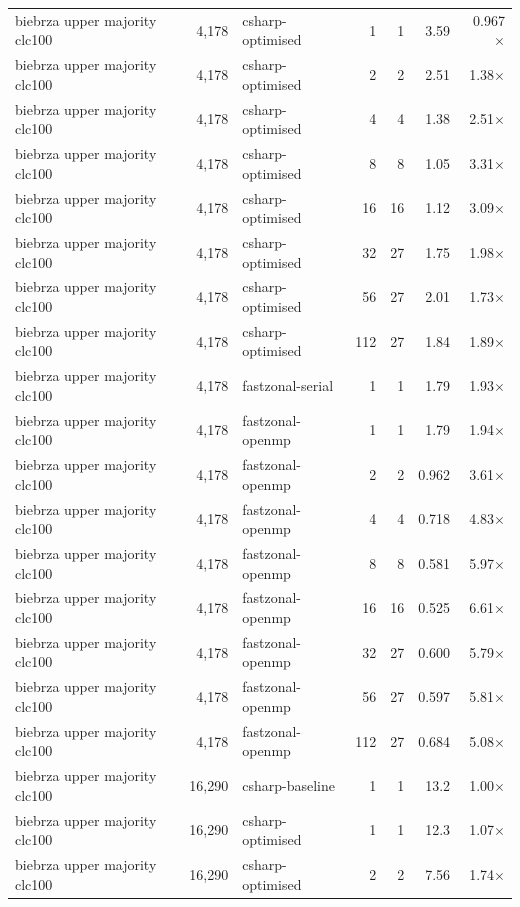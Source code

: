 \begin{tabular}{lrlrrrr}
biebrza upper majority clc100 & 4,178 & csharp-optimised & 1 & 1 & 3.59 & 0.967$\times$ \\
biebrza upper majority clc100 & 4,178 & csharp-optimised & 2 & 2 & 2.51 & 1.38$\times$ \\
biebrza upper majority clc100 & 4,178 & csharp-optimised & 4 & 4 & 1.38 & 2.51$\times$ \\
biebrza upper majority clc100 & 4,178 & csharp-optimised & 8 & 8 & 1.05 & 3.31$\times$ \\
biebrza upper majority clc100 & 4,178 & csharp-optimised & 16 & 16 & 1.12 & 3.09$\times$ \\
biebrza upper majority clc100 & 4,178 & csharp-optimised & 32 & 27 & 1.75 & 1.98$\times$ \\
biebrza upper majority clc100 & 4,178 & csharp-optimised & 56 & 27 & 2.01 & 1.73$\times$ \\
biebrza upper majority clc100 & 4,178 & csharp-optimised & 112 & 27 & 1.84 & 1.89$\times$ \\
biebrza upper majority clc100 & 4,178 & fastzonal-serial & 1 & 1 & 1.79 & 1.93$\times$ \\
biebrza upper majority clc100 & 4,178 & fastzonal-openmp & 1 & 1 & 1.79 & 1.94$\times$ \\
biebrza upper majority clc100 & 4,178 & fastzonal-openmp & 2 & 2 & 0.962 & 3.61$\times$ \\
biebrza upper majority clc100 & 4,178 & fastzonal-openmp & 4 & 4 & 0.718 & 4.83$\times$ \\
biebrza upper majority clc100 & 4,178 & fastzonal-openmp & 8 & 8 & 0.581 & 5.97$\times$ \\
biebrza upper majority clc100 & 4,178 & fastzonal-openmp & 16 & 16 & 0.525 & 6.61$\times$ \\
biebrza upper majority clc100 & 4,178 & fastzonal-openmp & 32 & 27 & 0.600 & 5.79$\times$ \\
biebrza upper majority clc100 & 4,178 & fastzonal-openmp & 56 & 27 & 0.597 & 5.81$\times$ \\
biebrza upper majority clc100 & 4,178 & fastzonal-openmp & 112 & 27 & 0.684 & 5.08$\times$ \\
biebrza upper majority clc100 & 16,290 & csharp-baseline & 1 & 1 & 13.2 & 1.00$\times$ \\
biebrza upper majority clc100 & 16,290 & csharp-optimised & 1 & 1 & 12.3 & 1.07$\times$ \\
biebrza upper majority clc100 & 16,290 & csharp-optimised & 2 & 2 & 7.56 & 1.74$\times$ \\

\end{tabular}

